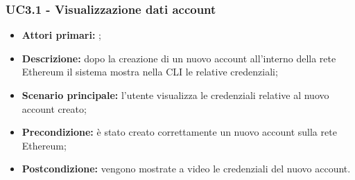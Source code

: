 \subsubsection{UC3.1 - Visualizzazione dati account}
\begin{itemize}
	\item \textbf{Attori primari:} \una{};
	\item \textbf{Descrizione:} dopo la creazione di un nuovo account all’interno della rete Ethereum il sistema mostra nella CLI le relative credenziali;
	\item \textbf{Scenario principale:} l’utente visualizza le credenziali relative al nuovo account creato;  
	\item \textbf{Precondizione:} è stato creato correttamente un nuovo account sulla rete Ethereum;   
	\item \textbf{Postcondizione:}  vengono mostrate a video le credenziali del nuovo account.  
\end{itemize}